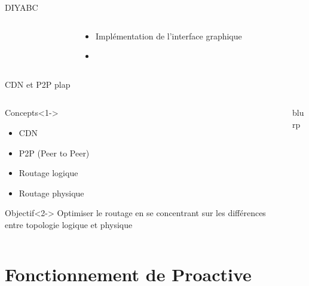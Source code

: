 \documentclass{beamer}
\begin{document}
\begin{frame}{DIYABC}
\begin{columns}
\begin{column}[l]{0.5\linewidth}
	\end{column}
	\begin{column}[r]{0.5\linewidth}
	\begin{block}{}
			\begin{itemize}
				\item Implémentation de l'interface graphique
                \item 
			\end{itemize}
					
		\end{block}
	\end{column}
	\end{columns}
\end{frame}

\begin{frame}{CDN et P2P}
    plap
\end{frame}



\begin{frame}
	\begin{columns}
		\begin{column}[l]{0.65\linewidth}
	\begin{block}{Concepts}<1->
		\begin{itemize}
			\item CDN
			\item P2P (Peer to Peer) %
			\item Routage logique
			\item Routage physique
		\end{itemize}
	\end{block}
	\begin{alertblock}{Objectif}<2->
		Optimiser le routage en se concentrant sur les différences
		entre topologie logique et physique
	\end{alertblock}
	\end{column}

		\begin{column}[r]{0.35\linewidth}
            blurp
\end{column}
\end{columns}
\end{frame}

\section[Fonctionnement]{Fonctionnement de Proactive}
\begin{frame}
	\tableofcontents[currentsection]
\end{frame}
\end{document}
